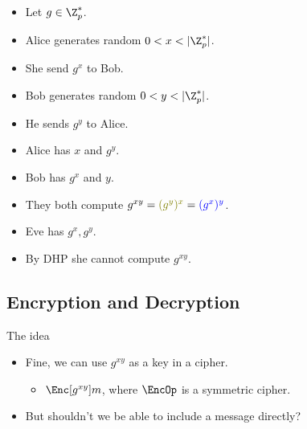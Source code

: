 \begin{frame}
  \begin{definition}
    \begin{itemize}
      \item Let \(g\in \Z_p^*\).

        \pause{}

      \color{green!50!red}
      \item Alice generates random \(0 < x < |\Z_p^*|\).
      \item She send \(g^x\) to Bob.

        \pause{}

      \color{blue}
      \item Bob generates random \(0 < y < |\Z_p^*|\).
      \item He sends \(g^y\) to Alice.

        \pause{}

      \color{green!50!red}
      \item Alice has \(x\) and \(g^y\).
      \color{blue}
      \item Bob has \(g^x\) and \(y\).
      \color{black}
      \item They both compute \(g^{xy} = {\color{green!50!red} (g^y)^x} 
          = {\color{blue} (g^x)^y}\).

        \pause{}

      \color{red}
      \item Eve has \(g^x, g^y\).
      \item By \ac{DHP} she cannot compute \(g^{xy}\).
    \end{itemize}
  \end{definition}
\end{frame}

\subsection{Encryption and Decryption}

\begin{frame}
  \begin{block}{The idea}
    \begin{itemize}
      \item Fine, we can use \(g^{xy}\) as a key in a cipher.
        \begin{itemize}
          \item \(\Enc[g^{xy}]{m}\), where \(\EncOp\) is a symmetric cipher.
        \end{itemize}
      \item But shouldn't we be able to include a message directly?
    \end{itemize}
  \end{block}
\end{frame}

